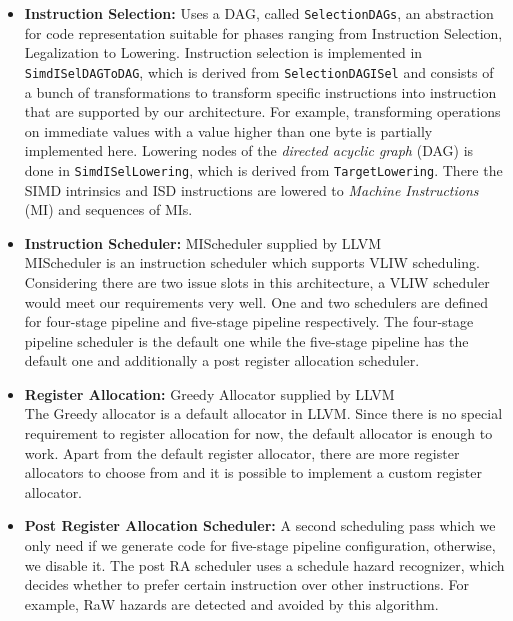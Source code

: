 \begin{itemize}
	\item \textbf{Instruction Selection:} Uses a DAG, called \texttt{SelectionDAGs}, an abstraction for code representation suitable for phases ranging from Instruction Selection, Legalization to Lowering. Instruction selection is implemented in  \texttt{SimdISelDAGToDAG}, which is derived from \texttt{SelectionDAGISel} and consists of a bunch of transformations to transform specific instructions into instruction that are supported by our architecture. For example, transforming operations on immediate values with a value higher than one byte is partially implemented here. Lowering nodes of the \emph{directed acyclic graph} (DAG) is done in \texttt{SimdISelLowering}, which is derived from \texttt{TargetLowering}. There the SIMD intrinsics and ISD instructions are lowered to \emph{Machine Instructions} (MI) and sequences of MIs.
	\item \textbf{Instruction Scheduler:} MIScheduler supplied by LLVM\\
MIScheduler is an instruction scheduler which supports VLIW scheduling. Considering there are two issue slots in this architecture, a VLIW scheduler would meet our requirements very well. One and two schedulers are defined for four-stage pipeline and five-stage pipeline respectively. The four-stage pipeline scheduler is the default one while the five-stage pipeline has the default one and additionally a post register allocation scheduler.
	\item \textbf{Register Allocation:} Greedy Allocator supplied by LLVM\\
	The Greedy allocator is a default allocator in LLVM. Since there is no special requirement to register allocation for now, the default allocator is enough to work. Apart from the default register allocator, there are more register allocators to choose from and it is possible to implement a custom register allocator.
	\item \textbf{Post Register Allocation Scheduler:} A second scheduling pass which we only need if we generate code for five-stage pipeline configuration, otherwise, we disable it. The post RA scheduler uses a schedule hazard recognizer, which decides whether to prefer certain instruction over other instructions. For example, RaW hazards are detected and avoided by this algorithm.

\end{itemize}
